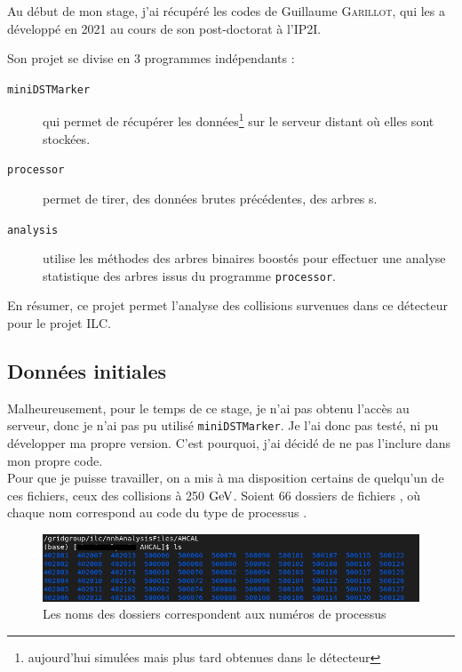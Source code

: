 Au début de mon stage, j'ai récupéré les codes de Guillaume \textsc{Garillot}, qui les a développé en 2021 au cours de son post-doctorat à l'IP2I. 

Son projet se divise en 3 programmes indépendants \Figure{\ref{orga:init}} :

\begin{description}
	
	\item[\texttt{miniDSTMarker}] qui permet de récupérer les données\footnote{aujourd'hui simulées mais plus tard obtenues dans le détecteur} sur le serveur distant où elles sont stockées.
	
	\item[\texttt{processor}] permet de tirer, des données brutes précédentes, des arbres \ROOT s.
	
	\item[\texttt{analysis}] utilise les méthodes des arbres binaires boostés pour effectuer une analyse statistique des arbres \ROOT issus du programme \texttt{processor}.
	
\end{description} 



En résumer, ce projet permet l'analyse des collisions survenues dans ce détecteur pour le projet ILC.


\subsection{Données initiales}


Malheureusement, pour le temps de ce stage, je n'ai pas obtenu l'accès au serveur, donc je n'ai pas pu utilisé \texttt{miniDSTMarker}. Je l'ai donc pas testé, ni pu développer ma propre version. C'est pourquoi, j'ai décidé de ne pas l'inclure dans mon propre code.\\

Pour que je puisse travailler, on a mis à ma disposition certains de quelqu'un de ces fichiers, ceux des collisions à 250 $\mathrm{GeV}$. Soient 66 dossiers \Figure{\ref{data:list}} de fichiers \LCIO, où chaque nom correspond au code du type de processus \Figure{\ref{data:def}}.

\begin{figure}[h!]
	\includegraphics[width=\textwidth]{../img/listeProcessus.png} 
	\caption{Les noms des dossiers correspondent aux numéros de processus}
	\label{data:list}
\end{figure}

